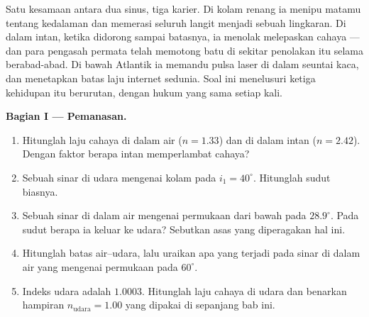 \begin{problem}
\label{pb:g10:refraction:1}
Satu kesamaan antara dua sinus, tiga karier. Di kolam renang ia menipu
matamu tentang kedalaman dan memerasi seluruh langit menjadi sebuah
lingkaran. Di dalam intan, ketika didorong sampai batasnya, ia menolak
melepaskan cahaya --- dan para pengasah permata telah memotong batu di
sekitar penolakan itu selama berabad-abad. Di bawah Atlantik ia memandu
pulsa laser di dalam seuntai kaca, dan menetapkan batas laju internet
sedunia. Soal ini menelusuri ketiga kehidupan itu berurutan, dengan
hukum yang sama setiap kali.

\medskip
\noindent\textbf{Bagian I --- Pemanasan.}
\begin{enumerate}
  \item Hitunglah laju cahaya di dalam air ($n = 1.33$) dan di dalam
        intan ($n = 2.42$). Dengan faktor berapa intan memperlambat
        cahaya?
  \item Sebuah sinar di udara mengenai kolam pada $i_1 = 40^\circ$.
        Hitunglah sudut biasnya.
  \item Sebuah sinar di dalam air mengenai permukaan dari bawah pada
        $28.9^\circ$. Pada sudut berapa ia keluar ke udara? Sebutkan
        asas yang diperagakan hal ini.
  \item Hitunglah  batas air--udara, lalu uraikan apa yang
        terjadi pada sinar di dalam air yang mengenai permukaan pada
        $60^\circ$.
  \item Indeks udara adalah $1.0003$. Hitunglah laju cahaya di udara dan
        benarkan hampiran $n_{\text{udara}} = 1.00$ yang dipakai di
        sepanjang bab ini.
\end{enumerate}


\end{problem}
